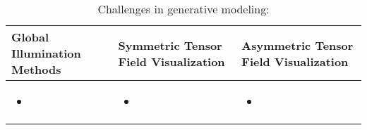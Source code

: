 \documentclass{scrartcl}
\begin{document}
\begin{table}[h]
\scriptsize
\centering
\caption{Challenges in generative modeling:}
\begin{tabularx}{\textwidth}{X|X|X}
Global Illumination Methods & Symmetric Tensor Field Visualization & Asymmetric Tensor Field Visualization\\
\toprule
\begin{itemize}
	\item
\end{itemize}
&
\begin{itemize}
	\item
\end{itemize}
& 
\begin{itemize}
	\item
\end{itemize}
\hline 
\end{tabularx}
   \vskip 1pt
\end{table} 


%
%
%
\end{document}
